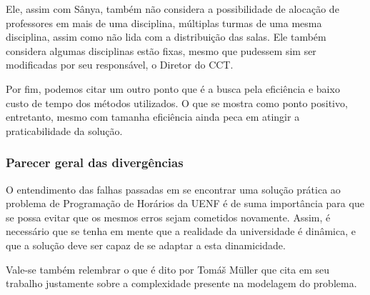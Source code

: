 Ele, assim com Sânya, também não considera a possibilidade de alocação de professores em mais de uma disciplina, múltiplas turmas de uma mesma disciplina, assim como não lida com a distribuição das salas. Ele também considera algumas disciplinas estão fixas, mesmo que pudessem sim ser modificadas por seu responsável, o Diretor do CCT.

Por fim, podemos citar um outro ponto que é a busca pela eficiência e baixo custo de tempo dos métodos utilizados. O que se mostra como ponto positivo, entretanto, mesmo com tamanha eficiência ainda peca em atingir a praticabilidade da solução.

\subsubsection{Parecer geral das divergências}

O entendimento das falhas passadas em se encontrar uma solução prática ao problema de Programação de Horários da UENF é de suma importância para que se possa evitar que os mesmos erros sejam cometidos novamente. Assim, é necessário que se tenha em mente que a realidade da universidade é dinâmica, e que a solução deve ser capaz de se adaptar a esta dinamicidade.

Vale-se também relembrar o que é dito por Tomáš Müller \cite{burke_modeling_2007} que cita em seu trabalho justamente sobre a complexidade presente na modelagem do problema.

